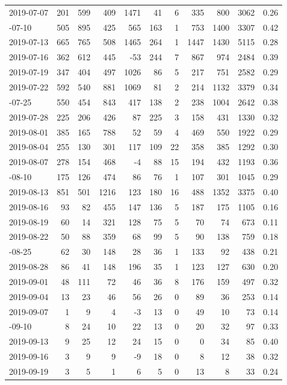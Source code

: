 \documentclass[
]{article}
\begin{document}
\begin{longtable}{lrrrrrrrrrr}
2019-07-07 & 201 & 599 & 409 & 1471 & 41 & 6 & 335 & 800 & 3062 & 0.26\\
\addlinespace
2019-07-10 & 505 & 895 & 425 & 565 & 163 & 1 & 753 & 1400 & 3307 & 0.42\\
2019-07-13 & 665 & 765 & 508 & 1465 & 264 & 1 & 1447 & 1430 & 5115 & 0.28\\
2019-07-16 & 362 & 612 & 445 & -53 & 244 & 7 & 867 & 974 & 2484 & 0.39\\
2019-07-19 & 347 & 404 & 497 & 1026 & 86 & 5 & 217 & 751 & 2582 & 0.29\\
2019-07-22 & 592 & 540 & 881 & 1069 & 81 & 2 & 214 & 1132 & 3379 & 0.34\\
\addlinespace
2019-07-25 & 550 & 454 & 843 & 417 & 138 & 2 & 238 & 1004 & 2642 & 0.38\\
2019-07-28 & 225 & 206 & 426 & 87 & 225 & 3 & 158 & 431 & 1330 & 0.32\\
2019-08-01 & 385 & 165 & 788 & 52 & 59 & 4 & 469 & 550 & 1922 & 0.29\\
2019-08-04 & 255 & 130 & 301 & 117 & 109 & 22 & 358 & 385 & 1292 & 0.30\\
2019-08-07 & 278 & 154 & 468 & -4 & 88 & 15 & 194 & 432 & 1193 & 0.36\\
\addlinespace
2019-08-10 & 175 & 126 & 474 & 86 & 76 & 1 & 107 & 301 & 1045 & 0.29\\
2019-08-13 & 851 & 501 & 1216 & 123 & 180 & 16 & 488 & 1352 & 3375 & 0.40\\
2019-08-16 & 93 & 82 & 455 & 147 & 136 & 5 & 187 & 175 & 1105 & 0.16\\
2019-08-19 & 60 & 14 & 321 & 128 & 75 & 5 & 70 & 74 & 673 & 0.11\\
2019-08-22 & 50 & 88 & 359 & 68 & 99 & 5 & 90 & 138 & 759 & 0.18\\
\addlinespace
2019-08-25 & 62 & 30 & 148 & 28 & 36 & 1 & 133 & 92 & 438 & 0.21\\
2019-08-28 & 86 & 41 & 148 & 196 & 35 & 1 & 123 & 127 & 630 & 0.20\\
2019-09-01 & 48 & 111 & 72 & 46 & 36 & 8 & 176 & 159 & 497 & 0.32\\
2019-09-04 & 13 & 23 & 46 & 56 & 26 & 0 & 89 & 36 & 253 & 0.14\\
2019-09-07 & 1 & 9 & 4 & -3 & 13 & 0 & 49 & 10 & 73 & 0.14\\
\addlinespace
2019-09-10 & 8 & 24 & 10 & 22 & 13 & 0 & 20 & 32 & 97 & 0.33\\
2019-09-13 & 9 & 25 & 12 & 24 & 15 & 0 & 0 & 34 & 85 & 0.40\\
2019-09-16 & 3 & 9 & 9 & -9 & 18 & 0 & 8 & 12 & 38 & 0.32\\
2019-09-19 & 3 & 5 & 1 & 6 & 5 & 0 & 13 & 8 & 33 & 0.24\\
\bottomrule
\end{longtable}
\end{document}
